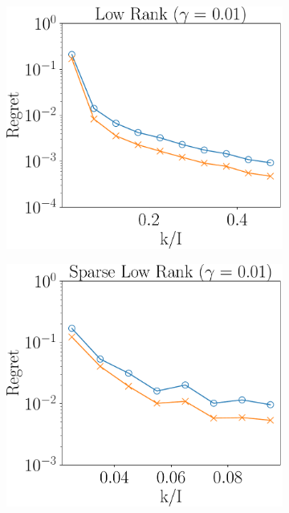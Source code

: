 \begin{figure}
	\centering
	\begin{subfigure}{0.3\textwidth}
		\includegraphics[scale = 0.25]{figure/fig3_lk_lnoise_200.pdf}
	\end{subfigure}
	\begin{subfigure}{0.3\textwidth}
		\includegraphics[scale = 0.25]{figure/fig3_slk_lnoise_200.pdf}
	\end{subfigure}

\end{figure}
